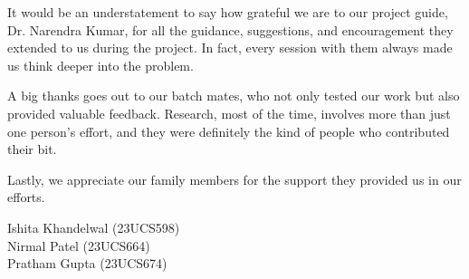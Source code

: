 
It would be an understatement to say how grateful we are to our project guide, Dr. Narendra Kumar, for all the guidance, suggestions, and encouragement they extended to us during the project. In fact, every session with them always made us think deeper into the problem.

A big thanks goes out to our batch mates, who not only tested our work but also provided valuable feedback. Research, most of the time, involves more than just one person's effort, and they were definitely the kind of people who contributed their bit.

Lastly, we appreciate our family members for the support they provided us in our efforts.

\vspace{1cm}
\noindent Ishita Khandelwal (23UCS598)\\
Nirmal Patel (23UCS664)\\
Pratham Gupta (23UCS674)
